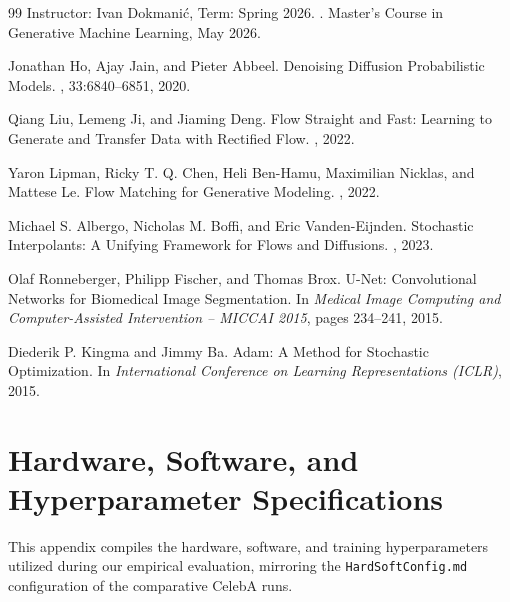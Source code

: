 \documentclass[11pt,a4paper]{article}
\begin{document}
\begin{thebibliography}{99}
Instructor: Ivan Dokmani\'{c}, Term: Spring 2026.
.
\newblock Master's Course in Generative Machine Learning, May 2026.

Jonathan Ho, Ajay Jain, and Pieter Abbeel.
\newblock Denoising Diffusion Probabilistic Models.
, 33:6840--6851, 2020.

Qiang Liu, Lemeng Ji, and Jiaming Deng.
\newblock Flow Straight and Fast: Learning to Generate and Transfer Data with Rectified Flow.
, 2022.

Yaron Lipman, Ricky T. Q. Chen, Heli Ben-Hamu, Maximilian Nicklas, and Mattese Le.
\newblock Flow Matching for Generative Modeling.
, 2022.

Michael S. Albergo, Nicholas M. Boffi, and Eric Vanden-Eijnden.
\newblock Stochastic Interpolants: A Unifying Framework for Flows and Diffusions.
, 2023.

Olaf Ronneberger, Philipp Fischer, and Thomas Brox.
\newblock U-Net: Convolutional Networks for Biomedical Image Segmentation.
\newblock In {\em Medical Image Computing and Computer-Assisted Intervention -- MICCAI 2015}, pages 234--241, 2015.

Diederik P. Kingma and Jimmy Ba.
\newblock Adam: A Method for Stochastic Optimization.
\newblock In {\em International Conference on Learning Representations (ICLR)}, 2015.
\end{thebibliography}

\appendix
\section{Hardware, Software, and Hyperparameter Specifications}
This appendix compiles the hardware, software, and training hyperparameters utilized during our empirical evaluation, mirroring the \texttt{HardSoftConfig.md} configuration of the comparative CelebA runs.
\end{document}
